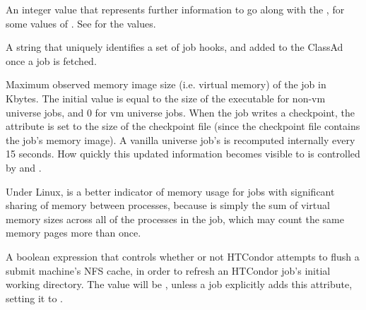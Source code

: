 \begin{description}
\clearpage

\item[\AdAttr{HoldReasonSubCode}:]    An integer value that represents further
information to go along with the , for
some values of .
See  for the values.

\item[\AdAttr{HookKeyword}:] A string that uniquely identifies
a set of job hooks, and added to the ClassAd once a job is fetched.

\item[\AdAttr{ImageSize}:]  Maximum observed memory image size
(i.e. virtual memory) of the
job in Kbytes.  The initial value is equal to the size of the
executable for non-vm universe jobs, and 0 for vm universe jobs.
When the job writes a checkpoint, the 
attribute is set to the size of the checkpoint file (since the
checkpoint file contains the job's memory image).
A vanilla universe job's  is recomputed
internally every 15 seconds.
How quickly this updated information becomes visible to  is
controlled by  and
.

Under Linux,  is a better indicator of
memory usage for jobs with significant sharing of memory between
processes, because  is simply the sum of virtual
memory sizes across all of the processes in the job, which may count
the same memory pages more than once.

\label{IwdFlushNFSCache-job-attribute}
\item[\AdAttr{IwdFlushNFSCache}:]  A boolean expression that controls
whether or not HTCondor attempts to flush a submit machine's NFS cache,
in order to refresh an HTCondor job's initial working directory.
The value will be , unless a job explicitly adds this
attribute, setting it to .


\end{description}
